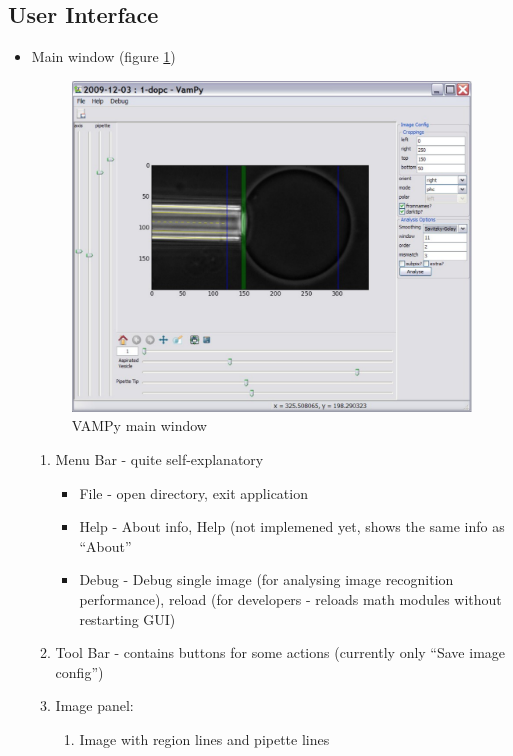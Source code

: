 \subsection{User Interface}\label{vampy-ui}
\begin{itemize}
	\item Main window (figure \ref{fig:vampymain})
		\begin{figure}[htbp]
			\centering
			\includegraphics[width=1.00\textwidth]{figs/vampymain.pdf}
			\caption{VAMPy main window}
			\label{fig:vampymain}
		\end{figure}
		\begin{enumerate}
				\item Menu Bar - quite self-explanatory
					\begin{itemize}
						\item File - open directory, exit application
						\item Help - About info, Help (not implemened yet, shows the same info as ``About''
						\item Debug - Debug single image (for analysing image recognition performance), reload (for developers - reloads math modules without restarting GUI)
					\end{itemize}
				\item Tool Bar - contains buttons for some actions (currently only ``Save image config'')
				\item Image panel:
					\begin{enumerate}
						\item Image with region lines and pipette lines

\end{enumerate}
\end{enumerate}
\end{itemize}
